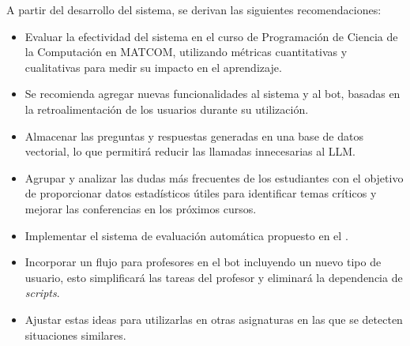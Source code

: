 \begin{recomendations}
    A partir del desarrollo del sistema, se derivan las siguientes recomendaciones:

    \begin{itemize}
        \item Evaluar la efectividad del sistema en el curso de Programación de Ciencia de la Computación en \mbox{MATCOM}, utilizando métricas cuantitativas y cualitativas para medir su impacto en el aprendizaje.
        
        \item Se recomienda agregar nuevas funcionalidades al sistema y al bot, basadas en la retroalimentación de los usuarios durante su utilización.
        
        \item Almacenar las preguntas y respuestas generadas en una base de datos vectorial, lo que permitirá reducir las llamadas innecesarias al LLM.
    
        \item Agrupar y analizar las dudas más frecuentes de los estudiantes con el objetivo de proporcionar datos estadísticos útiles para identificar temas críticos y mejorar las conferencias en los próximos cursos.
        
        \item Implementar el sistema de evaluación automática propuesto en el .
        
        \item Incorporar un flujo para profesores en el bot incluyendo un nuevo tipo de usuario, esto simplificará las tareas del profesor y eliminará la dependencia de \textit{scripts}.
        
        \item Ajustar estas ideas para utilizarlas en otras asignaturas en las que se detecten situaciones similares.
    \end{itemize}
\end{recomendations}
